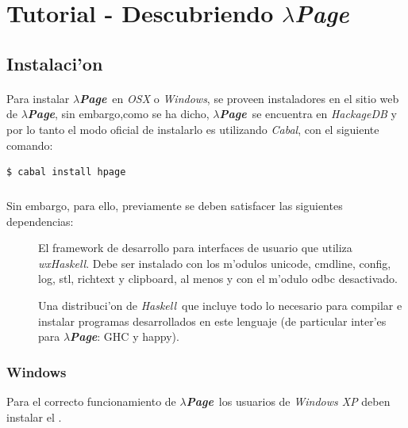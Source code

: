 \documentclass[a4paper]{article}
\newcommand{\haskell}{\textsl{Haskell}}
\newcommand{\hpage}{\textbf{\textsl{$\lambda$Page}}}
\begin{document}
\section{Tutorial - Descubriendo \hpage}
\subsection{Instalaci'on}
\begin{epigraphs}
\end{epigraphs}
\paragraph{}Para instalar \hpage\ en \textsl{OSX} o \textsl{Windows}, se proveen instaladores en el sitio web de \hpage, sin embargo,como se ha dicho, \hpage\ se encuentra en \textsl{HackageDB} y por lo tanto el modo oficial de instalarlo es utilizando \textsl{Cabal}, con el siguiente comando:
\lstset{language=sh, frame=single, tabsize=2}
\begin{lstlisting}
$ cabal install hpage
\end{lstlisting}
\subparagraph{}Sin embargo, para ello, previamente se deben satisfacer las siguientes dependencias:
\begin{description}
	\item[] El framework de desarrollo para interfaces de usuario que utiliza \textsl{wxHaskell}.  Debe ser instalado con los m'odulos unicode, cmdline, config, log, stl, richtext y clipboard, al menos y con el m'odulo odbc desactivado.
	\item[] Una distribuci'on de \haskell\ que incluye todo lo necesario para compilar e instalar programas desarrollados en este lenguaje (de particular inter'es para \hpage: GHC y happy).
\end{description}
\subsubsection{Windows}Para el correcto funcionamiento de \hpage\ los usuarios de \textsl{Windows XP} deben instalar el .
\end{document}
